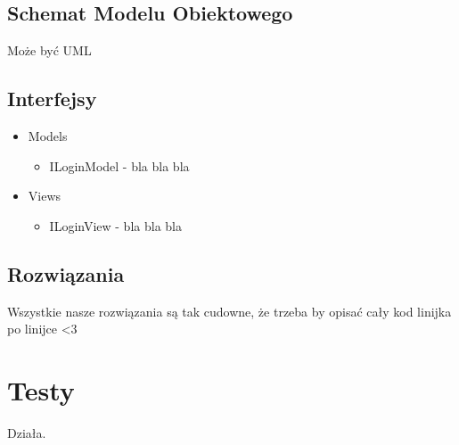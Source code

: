 \documentclass[12pt,a4paper]{article}
\begin{document}
		\subsection{Schemat Modelu Obiektowego}
			Może być UML		
		\subsection{Interfejsy}
			\begin{itemize}
				\item Models
				\begin{itemize}
					\item ILoginModel - bla bla bla
				\end{itemize}
				\item Views
				\begin{itemize}
					\item ILoginView - bla bla bla
				\end{itemize}
			\end{itemize}
		\subsection{Rozwiązania}
			Wszystkie nasze rozwiązania są tak cudowne, że trzeba by opisać cały kod linijka po linijce <3
	\section{Testy}
		Działa. 
\end{document}
